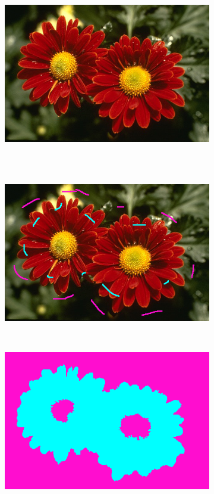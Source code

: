 \begin{emodif}
\begin{figure}[htb]
 \centering
 \begin{subfigure}{0.4\textwidth}	
\includegraphics[width=\textwidth]{images/evaluation/fails/im_c}
 \end{subfigure}
 \\~\\
 \begin{subfigure}{0.4\textwidth}	
\includegraphics[width=\textwidth]{images/evaluation/fails/germes_c_01}
 \end{subfigure}
 ~
 \begin{subfigure}{0.4\textwidth}	
\includegraphics[width=\textwidth]{images/evaluation/fails/seg_c_01}

\end{subfigure}
\end{figure}
\end{emodif}
